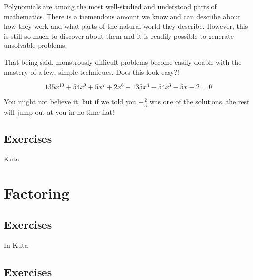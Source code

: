 

Polynomials are among the most well-studied and understood parts of mathematics.
There is a tremendous amount we know and can describe about how they work
and what parts of the natural world they describe.  However, this is still so much
to discover about them and it is readily possible to generate unsolvable problems.

That being said, monstrously difficult problems become easily doable with the mastery
of a few, simple techniques.  Does this look easy?!


\begin{equation}
135x^{10} + 54x^9 + 5x^7 + 2x^6 - 135x^4 - 54x^3 - 5x - 2 = 0
\end{equation}

You might not believe it, but if we told you $-\frac{2}{5}$ was one of the solutions, 
the rest will jump out at you in no time flat!


\newpage
\chapterminitoc


\newpage
{}
\newpage

\newpage
\subsection{Exercises}
Kuta



\newpage
\section{Factoring}
\noindent{}

\newpage
\subsection{Exercises}
In Kuta



\newpage
{}
\newpage

\newpage
\subsection{Exercises}
\noindent{}
\newpage
\noindent{}
\newpage
\noindent{}



